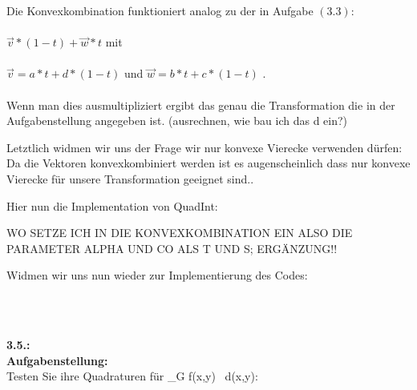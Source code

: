 \documentclass[a4paper,11pt,bibliography=totoc,listof=totoc,headinclude=true,cleardoublepage=empty,oneside]{scrbook}
\begin{document}
		
		Die Konvexkombination funktioniert analog zu der in Aufgabe $(3.3)$: \\ \\
		\hspace{2mm}\color{olive}
		\hspace{4cm}$\vec{v}*(1-t)+\vec{w}*t$
		\color{change2}
		mit\\ \\
		\color{olive}
	\hspace{2.6cm}	$\vec{v} = a*t+d*(1-t)$ \color{change2}und
		\color{olive}$\vec{w} = b*t+c*(1-t)$ . \\
		\color{change2}
		\hspace{2mm}
		\\Wenn man dies ausmultipliziert ergibt das genau die Transformation die in der Aufgabenstellung angegeben ist.
		(ausrechnen, wie bau ich das d ein?)
		
		Letztlich widmen wir uns der Frage wir nur konvexe Vierecke verwenden dürfen:
		Da die Vektoren konvexkombiniert werden ist es augenscheinlich dass nur konvexe Vierecke für unsere Transformation geeignet sind..
		
		Hier nun die Implementation von QuadInt:
		
		WO SETZE ICH IN DIE KONVEXKOMBINATION EIN ALSO DIE PARAMETER ALPHA UND CO ALS T UND S; ERGÄNZUNG!!
		
		Widmen wir uns nun wieder zur Implementierung des Codes:
		\color{change}
		\lstset{ 
			language=Matlab, 
			showstringspaces=false}
		
		 
		\begin{lstlisting} 
		
		
		\end{lstlisting}
		
		
		
		
		
		\color{change2}
		\item \textbf{\Large{3.5.:}}\linebreak \\
		\textbf{Aufgabenstellung:} \linebreak \\
		 Testen Sie ihre Quadraturen für \int \limits_{G} \! f(x,y) \, d(x,y):
		
\end{document}
